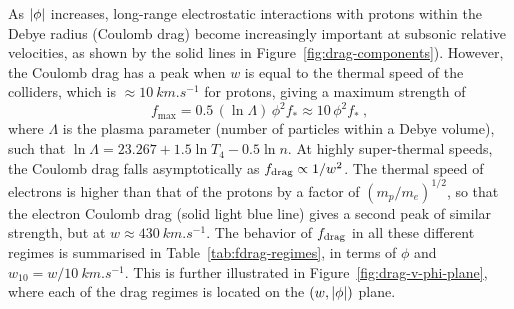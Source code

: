 As \(\lvert\phi\rvert\) increases, long-range electrostatic interactions with
protons within the Debye radius (Coulomb drag) become increasingly
important at subsonic relative velocities, as shown by the solid lines
in Figure~\ref{fig:drag-components}).
However, the Coulomb drag has a peak when \(w\) is equal to the
thermal speed of the colliders, which is
\(\approx \SI{10}{km.s^{-1}}\) for protons, giving a maximum strength of
\begin{equation}
  \label{eq:fdrag-maximum}
  f_{\mathrm{max}} = 0.5\, (\ln\Lambda)\, \phi^2 f_* \approx 10\, \phi^2 f_* \ , 
\end{equation}
where \(\Lambda\) is the plasma parameter (number of particles within a
Debye volume), such that
\(\ln\Lambda = 23.267 + 1.5 \ln T_4 - 0.5 \ln n\).  At highly super-thermal
speeds, the Coulomb drag falls asymptotically as
\(f_{\text{drag}} \propto 1 / w^{2}\).  The thermal speed of electrons is higher than
that of the protons by a factor of \((m_p / m_e)^{1/2}\), so that the
electron Coulomb drag (solid light blue line) gives a second peak of
similar strength, but at \(w \approx \SI{430}{km.s^{-1}}\).  The behavior of
\(f_{\text{drag}}\) in all these different regimes is summarised in
Table~\ref{tab:fdrag-regimes}, in terms of \(\phi\) and
\(w_{10} = w / \SI{10}{km.s^{-1}}\).  This is further illustrated in
Figure~\ref{fig:drag-v-phi-plane}, where each of the drag regimes is
located on the \((w, \lvert\phi\rvert)\) plane.



